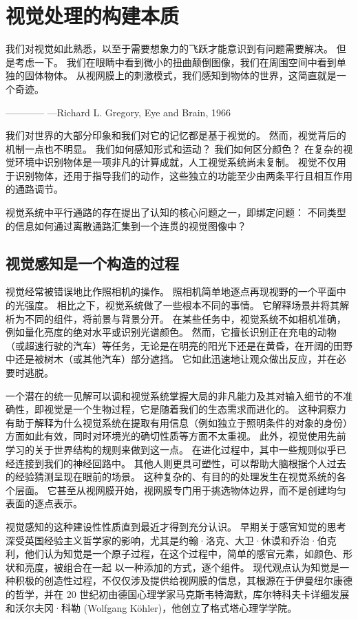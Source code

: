 \chapter{视觉处理的构建本质} \label{chap:chap21}

我们对视觉如此熟悉，以至于需要想象力的飞跃才能意识到有问题需要解决。
但是考虑一下。
我们在眼睛中看到微小的扭曲颠倒图像，我们在周围空间中看到单独的固体物体。
从视网膜上的刺激模式，我们感知到物体的世界，这简直就是一个奇迹。

———— —Richard L. Gregory, Eye and Brain, 1966


我们对世界的大部分印象和我们对它的记忆都是基于视觉的。
然而，视觉背后的机制一点也不明显。
我们如何感知形式和运动？
我们如何区分颜色？
在复杂的视觉环境中识别物体是一项非凡的计算成就，人工视觉系统尚未复制。
视觉不仅用于识别物体，还用于指导我们的动作，这些独立的功能至少由两条平行且相互作用的通路调节。


视觉系统中平行通路的存在提出了认知的核心问题之一，即绑定问题：
不同类型的信息如何通过离散通路汇集到一个连贯的视觉图像中？



\section{视觉感知是一个构造的过程}

视觉经常被错误地比作照相机的操作。
照相机简单地逐点再现视野的一个平面中的光强度。
相比之下，视觉系统做了一些根本不同的事情。
它解释场景并将其解析为不同的组件，将前景与背景分开。
在某些任务中，视觉系统不如相机准确，例如量化亮度的绝对水平或识别光谱颜色。
然而，它擅长识别正在充电的动物（或超速行驶的汽车）等任务，无论是在明亮的阳光下还是在黄昏，在开阔的田野中还是被树木（或其他汽车）部分遮挡。
它如此迅速地让观众做出反应，并在必要时逃脱。


一个潜在的统一见解可以调和视觉系统掌握大局的非凡能力及其对输入细节的不准确性，即视觉是一个生物过程，它是随着我们的生态需求而进化的。
这种洞察力有助于解释为什么视觉系统在提取有用信息（例如独立于照明条件的对象的身份）方面如此有效，同时对环境光的确切性质等方面不太重视。
此外，视觉使用先前学习的关于世界结构的规则来做到这一点。
在进化过程中，其中一些规则似乎已经连接到我们的神经回路中。
其他人则更具可塑性，可以帮助大脑根据个人过去的经验猜测呈现在眼前的场景。
这种复杂的、有目的的处理发生在视觉系统的各个层面。 
它甚至从视网膜开始，视网膜专门用于挑选物体边界，而不是创建均匀表面的逐点表示。


视觉感知的这种建设性性质直到最近才得到充分认识。
早期关于感官知觉的思考深受英国经验主义哲学家的影响，尤其是约翰·洛克、大卫·休谟和乔治·伯克利，他们认为知觉是一个原子过程，在这个过程中，简单的感官元素，如颜色、形状和亮度，被组合在一起 以一种添加的方式，逐个组件。
现代观点认为知觉是一种积极的创造性过程，不仅仅涉及提供给视网膜的信息，其根源在于伊曼纽尔康德的哲学，并在 20 世纪初由德国心理学家马克斯韦特海默，库尔特科夫卡详细发展 和沃尔夫冈·科勒 (Wolfgang Köhler)，他创立了格式塔心理学学院。


